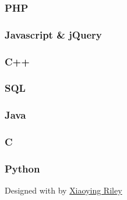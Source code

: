 \documentclass[english,]{article}
\begin{document}
\hypertarget{php}{%
\subsubsection{PHP}\label{php}}

\hypertarget{javascript-jquery}{%
\subsubsection{Javascript \& jQuery}\label{javascript-jquery}}

\hypertarget{c}{%
\subsubsection{C++}\label{c}}

\hypertarget{sql}{%
\subsubsection{SQL}\label{sql}}

\hypertarget{java}{%
\subsubsection{Java}\label{java}}

\hypertarget{c-1}{%
\subsubsection{C}\label{c-1}}

\hypertarget{python}{%
\subsubsection{Python}\label{python}}

{Designed with \emph{} by \href{http://themes.3rdwavemedia.com}{Xiaoying
Riley}}
\end{document}
